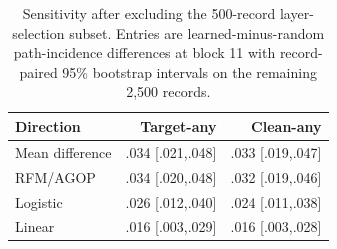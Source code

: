 \begin{table}[t]
\centering
\small
\setlength{\tabcolsep}{3.6pt}
\caption{Sensitivity after excluding the 500-record layer-selection subset.
Entries are learned-minus-random path-incidence differences at block 11 with
record-paired 95\% bootstrap intervals on the remaining 2,500 records.}
\label{tab:pilot-exclusion-outcomes}
\begin{tabular}{@{}lrr@{}}
\toprule
Direction & Target-any & Clean-any \\
\midrule
Mean difference & .034 [.021,.048] & .033 [.019,.047] \\
RFM/AGOP & .034 [.020,.048] & .032 [.019,.046] \\
Logistic & .026 [.012,.040] & .024 [.011,.038] \\
Linear & .016 [.003,.029] & .016 [.003,.028] \\
\bottomrule
\end{tabular}

\end{table}
